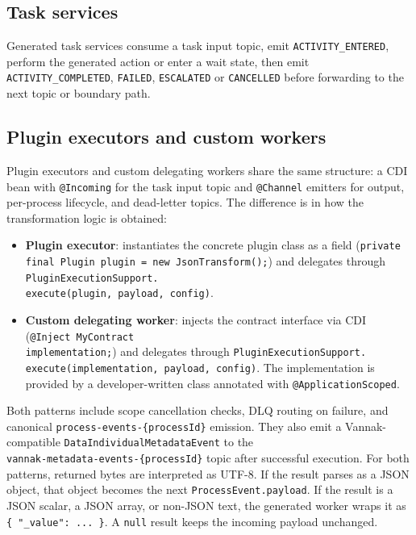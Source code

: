 \subsection{Task services}

Generated task services consume a task input topic, emit \texttt{ACTIVITY\_ENTERED}, perform
the generated action or enter a wait state, then emit \texttt{ACTIVITY\_COMPLETED},
\texttt{FAILED}, \texttt{ESCALATED} or \texttt{CANCELLED} before forwarding to the next
topic or boundary path.

\subsection{Plugin executors and custom workers}

Plugin executors and custom delegating workers share the same structure: a CDI bean
with \texttt{@Incoming} for the task input topic and \texttt{@Channel} emitters for
output, per-process lifecycle, and dead-letter topics. The difference is in how the
transformation logic is obtained:

\begin{itemize}
\item \textbf{Plugin executor}: instantiates the concrete plugin class as a field
  (\texttt{private final Plugin plugin = new JsonTransform();}) and delegates
  through \texttt{PluginExecutionSupport.\\execute(plugin, payload, config)}.
\item \textbf{Custom delegating worker}: injects the contract interface via CDI
  (\texttt{@Inject MyContract \\ implementation;}) and delegates through
  \texttt{PluginExecutionSupport.\\execute(implementation, payload, config)}. The
  implementation is provided by a developer-written class annotated with
  \texttt{@ApplicationScoped}.
\end{itemize}

Both patterns include scope cancellation checks, DLQ routing on failure, and
canonical \texttt{process-events-\{processId\}} emission. They also emit a Vannak-compatible
\texttt{DataIndividualMetadataEvent} to the \\ \texttt{vannak-metadata-events-\{processId\}} topic
after successful execution.
For both patterns, returned bytes are interpreted as UTF-8. If the result parses
as a JSON object, that object becomes the next \texttt{ProcessEvent.payload}. If
the result is a JSON scalar, a JSON array, or non-JSON text, the generated worker
wraps it as \texttt{\{ "\_value": ... \}}. A \texttt{null} result keeps the incoming
payload unchanged.

